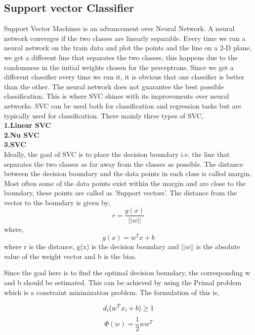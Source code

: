 \documentclass[sigconf]{acmart}
\begin{document}
\subsection{Support vector Classifier}
Support Vector Machines is an advancement over Neural Network. A neural network converges if the two classes are linearly separable. Every time we run a neural network on the train data and plot the points and the line on a 2-D plane, we get a different line that separates the two classes, this happens due to the randomness in the initial weights chosen for the perceptrons. Since we get a different classifier every time we run it, it is obvious that one classifier is better than the other. The neural network does not guarantee the best possible classification. This is where SVC shines with its improvements over neural networks. SVC can be used both for classification and regression tasks but are typically used for classification. There mainly three types of SVC,\\\cite{Williamson2}
\textbf{1.Linear SVC}\\
\textbf{2.Nu SVC}\\
\textbf{3.SVC}\\

Ideally, the goal of SVC is to place the decision boundary i.e. the line that separates the two classes as far away from the classes as possible. The distance between the decision boundary and the data points in each class is called margin. Most often some of the data points exist within the margin and are close to the boundary, these points are called as 'Support vectors'. The distance from the vector to the boundary is given by,\cite{Williamson2}
\begin{equation}
    r = \frac{g(x)}{||w||}
\end{equation} 
where,
\begin{equation}
    g(x) = w^Tx+b
\end{equation}
where r is the distance, g(x) is the decision boundary and $||w||$ is the absolute value of the weight vector and b is the bias.

Since the goal here is to find the optimal decision boundary, the corresponding w and b should be estimated. This can be achieved by using the Primal problem which is a constraint minimization problem. The formulation of this is,\cite{Williamson2}

\begin{equation}
    d_i(w^Tx_i +b) \geq 1\\
\end{equation}
\begin{equation}
      \Phi(w) = \frac{1}{2}ww^T
\end{equation}
\end{document}
